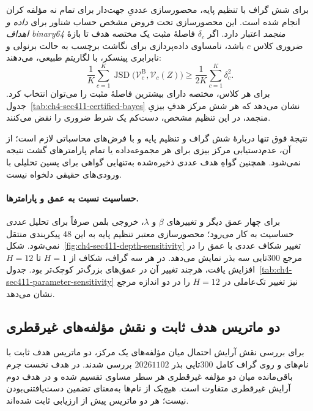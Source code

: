 برای شش گراف با تنظیم پایه، محصورسازی عددیِ جهت‌دار برای تمام نه مؤلفه کران انجام شده است. این محصورسازی تحت فروض مشخص حساب شناور برای \emph{داده و اهداف binary64 منجمد} اعتبار دارد. اگر $\delta_c$ فاصلهٔ مثبت یک مختصه هدف تا بازهٔ ضروری کلاس $c$ باشد، نامساوی داده‌پردازی برای نگاشت برچسب به حالت برنولی و نابرابری پینسکر، با لگاریتم طبیعی، می‌دهند:
\begin{equation}\label{eq:ch4-sec411-js-lower}
\frac{1}{K}\sum_{c=1}^{K}
\operatorname{JSD}\bigl(\mathcal V_c^{\mathrm B},\mathcal V_c(Z)\bigr)
\ge\frac{1}{2K}\sum_{c=1}^{K}\delta_c^2.
\end{equation}
برای هر کلاس، مختصه دارای بیشترین فاصلهٔ مثبت را می‌توان انتخاب کرد. جدول~\ref{tab:ch4-sec411-certified-bayes} نشان می‌دهد که هر شش مرکز هدفِ بیزیِ منجمد، در این تنظیم مشخص، دست‌کم یک شرط ضروری را نقض می‌کنند.


نتیجهٔ فوق تنها دربارهٔ شش گراف و تنظیم پایه و با فرض‌های محاسباتی لازم است؛ از آن، عدم‌دستیابی مرکز بیزی برای هر مجموعه‌داده یا تمام پارامترهای گشت نتیجه نمی‌شود. همچنین گواهِ هدف عددی ذخیره‌شده به‌تنهایی گواهی برای پسین تحلیلی با ورودی‌های حقیقی دلخواه نیست.

\paragraph{حساسیت نسبت به عمق و پارامترها.}
برای چهار عمق دیگر و تغییرهای $\beta$ و $\lambda$، خروجی بلمن صرفاً برای تحلیل \emph{عددی} حساسیت به کار می‌رود؛ محصورسازی معتبر تنظیم پایه به این $48$ پیکربندی منتقل نمی‌شود. شکل~\ref{fig:ch4-sec411-depth-sensitivity} تغییر شکاف عددی با عمق را در مرجع $300$تایی سه بذر نمایش می‌دهد. در هر سه گراف، شکاف از $H=1$ تا $H=12$ افزایش یافت، هرچند تغییر آن در عمق‌های بزرگ‌تر کوچک‌تر بود. جدول~\ref{tab:ch4-sec411-parameter-sensitivity} نیز تغییر تک‌عاملی در $H=12$ را در دو اندازه مرجع نشان می‌دهد.



\subsection{دو ماتریس هدف ثابت و نقش مؤلفه‌های غیرقطری}
\label{subsec:ch4-full300-relaxed-diagonal}
برای بررسی نقش آرایش احتمال میان مؤلفه‌های یک مرکز، دو ماتریس هدف ثابت با نام‌های  و  روی گراف کامل $300$تایی بذر $20261102$ بررسی شدند. در هدف نخست جرم باقی‌مانده میان دو مؤلفه غیرقطری هر سطر مساوی تقسیم شده و در هدف دوم آرایش غیرقطری متفاوت است. هیچ‌یک از نام‌ها به‌معنای تضمین دست‌یافتنی‌بودن نیست؛ هر دو ماتریس پیش از ارزیابی ثابت شده‌اند.

